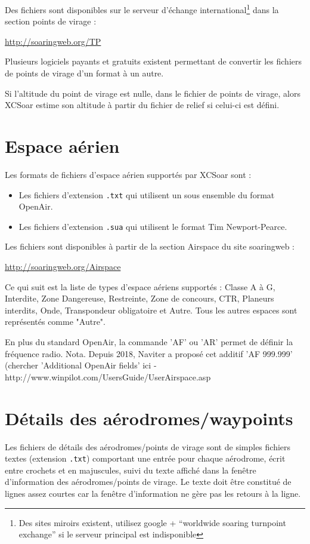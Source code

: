 Des fichiers sont disponibles sur le serveur d'échange international\footnote{Des sites miroirs existent, utilisez google + ``worldwide soaring turnpoint exchange'' si le serveur principal est indisponible} dans la section points de virage : 

{\href{http://soaringweb.org/TP/}{http://soaringweb.org/TP}}

Plusieurs logiciels payants et gratuits existent permettant de convertir les fichiers de points de virage d'un format à un autre. 

Si l'altitude du point de virage est nulle, dans le fichier de points de virage, alors XCSoar estime son altitude à partir du fichier de relief si celui-ci est défini.


\section{Espace aérien}

Les formats de fichiers d'espace aérien supportés par XCSoar sont :
\begin{itemize}
\item Les fichiers d'extension \verb|.txt| qui utilisent un sous ensemble du format OpenAir.
\item Les fichiers d'extension \verb|.sua| qui utilisent le format Tim Newport-Pearce.
\end{itemize}

Les fichiers sont disponibles à partir de la section Airspace du site soaringweb :

{\href{http://soaringweb.org/Airspace/}{http://soaringweb.org/Airspace}}

Ce qui suit est la liste de types d'espace aériens supportés : Classe A à G, Interdite, Zone Dangereuse, Restreinte, Zone de concours, CTR, Planeurs interdits, Onde, Transpondeur obligatoire et Autre. Tous les autres espaces sont représentés comme "Autre".

En plus du standard OpenAir, la commande 'AF' ou 'AR' permet de définir la fréquence radio.
Nota. Depuis 2018, Naviter a proposé cet additif 'AF 999.999' (chercher 'Additional OpenAir fields' ici - http://www.winpilot.com/UsersGuide/UserAirspace.asp

\section{Détails des aérodromes/waypoints}\label{sec:Airfield-details}

Les fichiers de détails des aérodromes/points de virage sont de simples fichiers textes (extension \verb|.txt|) comportant une entrée pour chaque aérodrome, écrit entre crochets et en majuscules, suivi du texte affiché dans la fenêtre d'information des aérodromes/points de virage. Le texte doit être constitué de lignes assez courtes car la fenêtre d'information ne gère pas les retours à la ligne.

